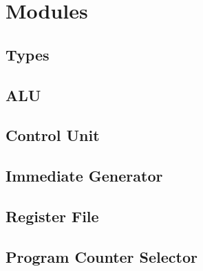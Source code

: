 \section{Modules}

\subsection{Types}

\subsection{ALU}

\subsection{Control Unit}

\subsection{Immediate Generator}

\subsection{Register File}

\subsection{Program Counter Selector}